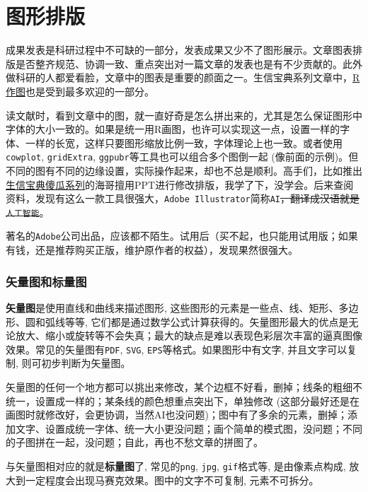 \documentclass[]{article}
\numberwithin{figure}{section}
\numberwithin{table}{section}
\theoremstyle{definition}
\theoremstyle{definition}
\theoremstyle{definition}
\theoremstyle{remark}
\begin{document}
\section{图形排版}\label{AI}

成果发表是科研过程中不可缺的一部分，发表成果又少不了图形展示。文章图表排版是否整齐规范、协调一致、重点突出对一篇文章的发表也是有不少贡献的。此外做科研的人都爱看脸，文章中的图表是重要的颜面之一。生信宝典系列文章中，\href{https://mp.weixin.qq.com/s/bsvB1k17Izom2ldgdwXrdg}{R作图}也是受到最多欢迎的一部分。

读文献时，看到文章中的图，就一直好奇是怎么拼出来的，尤其是怎么保证图形中字体的大小一致的。如果是统一用R画图，也许可以实现这一点，设置一样的字体、一样的长宽，这样只要图形缩放比例一致，字体理论上也一致。或者使用\texttt{cowplot},
\texttt{gridExtra}, \texttt{ggpubr}等工具也可以组合多个图倒一起
(像前面的示例)。但不同的图有不同的边缘设置，实际操作起来，却也不总是顺利。高手们，比如推出\href{http://mp.weixin.qq.com/s/LPWaxbKuS-XlvzkSE-MupQ}{生信宝典傻瓜系列}的海哥擅用PPT进行修改排版，我学了下，没学会。后来查阅资料，发现有这么一款工具很强大，\texttt{Adobe\ Illustrator}简称\texttt{AI}\sout{，翻译成汉语就是\texttt{人工智能}}。

著名的\texttt{Adobe}公司出品，应该都不陌生。试用后（买不起，也只能用试用版；如果有钱，还是推荐购买正版，维护原作者的权益），发现果然很强大。

\subsubsection{矢量图和标量图}

\textbf{矢量图}是使用直线和曲线来描述图形,
这些图形的元素是一些点、线、矩形、多边形、圆和弧线等等,
它们都是通过数学公式计算获得的。矢量图形最大的优点是无论放大、缩小或旋转等不会失真；最大的缺点是难以表现色彩层次丰富的逼真图像效果。常见的矢量图有\texttt{PDF},
\texttt{SVG}, \texttt{EPS}等格式。如果图形中有文字, 并且文字可以复制,
则可初步判断为矢量图。

矢量图的任何一个地方都可以挑出来修改，某个边框不好看，删掉；线条的粗细不统一，设置成一样的；某条线的颜色想重点突出下，单独修改
(这部分最好还是在画图时就修改好，会更协调，当然AI也没问题)；图中有了多余的元素，删掉；添加文字、设置成统一字体、统一大小更没问题；画个简单的模式图，没问题；不同的子图拼在一起，没问题；自此，再也不愁文章的拼图了。

与矢量图相对应的就是\textbf{标量图}了, 常见的\texttt{png}, \texttt{jpg},
\texttt{gif}格式等, 是由像素点构成,
放大到一定程度会出现马赛克效果。图中的文字不可复制, 元素不可拆分。
\end{document}
